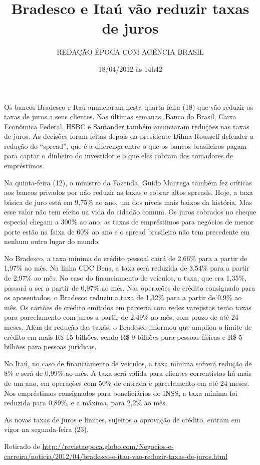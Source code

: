 \documentclass[12pt, a4paper]{article}
\title{Bradesco e Itaú vão reduzir taxas de juros}
\author{REDAÇÃO ÉPOCA COM AGÊNCIA BRASIL}
\date{18/04/2012 às 14h42}
\begin{document}
\maketitle

Os bancos Bradesco e Itaú anunciaram nesta quarta-feira (18) que vão reduzir as taxas de juros a seus clientes. Nas últimas semanas, Banco do Brasil, Caixa Econômica Federal, HSBC e Santander também anunciaram reduções nas taxas de juros. As decisões foram feitas depois da presidente Dilma Rousseff defender a redução do ``spread'', que é a diferença entre o que os bancos brasileiros pagam para captar o dinheiro do investidor e o que eles cobram dos tomadores de empréstimos.

Na quinta-feira (12), o ministro da Fazenda, Guido Mantega também fez críticas aos bancos privados por não reduzir as taxas e cobrar altos spreads. Hoje, a taxa básica de juro está em 9,75\% ao ano, um dos níveis mais baixos da história. Mas esse valor não tem efeito na vida do cidadão comum. Os juros cobrados no cheque especial chegam a 300\% ao ano, as taxas de empréstimos para negócios de menor porte estão na faixa de 60\% ao ano e o spread brasileiro não tem precedente em nenhum outro lugar do mundo.

No Bradesco, a taxa mínima do crédito pessoal cairá de 2,66\% para a partir de 1,97\% ao mês. Na linha CDC Bens, a taxa será reduzida de 3,54\% para a partir de 2,97\% ao mês. No caso do financiamento de veículos, a taxa, que era 1,35\%, passará a ser a partir de 0,97\% ao mês. Nas operações de crédito consignado para os aposentados, o Bradesco reduziu a taxa de 1,32\% para a partir de 0,9\% ao mês. Os cartões de crédito emitidos em parceria com redes varejistas terão taxas para parcelamento com juros a partir de 2,49\% ao mês, com prazo de até 24 meses. Além da redução das taxas, o Bradesco informou que ampliou o limite de crédito em mais R\$ 15 bilhões, sendo R\$ 9 bilhões para pessoas físicas e R\$ 5 bilhões para pessoas jurídicas.

No Itaú, no caso de financiamento de veículos, a taxa mínima sofrerá redução de 8\% e será de 0,99\% ao mês. A taxa será válida para clientes correntistas há mais de um ano, em operações com 50\% de entrada e parcelamento em até 24 meses. Nos empréstimos consignados para beneficiários do INSS, a taxa mínima foi reduzida para 0,89\%, e a máxima, para 2,2\% ao mês.

As novas taxas de juros e limites, sujeitos a aprovação de crédito, entram em vigor na segunda-feira (23).

\begin{flushright}
Retirado de \url{http://revistaepoca.globo.com/Negocios-e-carreira/noticia/2012/04/bradesco-e-itau-vao-reduzir-taxas-de-juros.html}
\end{flushright}
\end{document}
